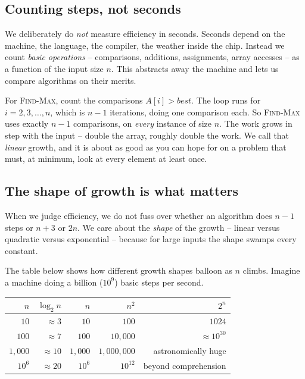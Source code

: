 \subsection{Counting steps, not seconds}

We deliberately do \emph{not} measure efficiency in seconds. Seconds depend on the
machine, the language, the compiler, the weather inside the chip. Instead we count
\emph{basic operations} -- comparisons, additions, assignments, array accesses --
as a function of the input size $n$. This abstracts away the machine and lets us
compare algorithms on their merits.

For \textsc{Find-Max}, count the comparisons $A[i] > best$. The loop runs for
$i = 2, 3, \dots, n$, which is $n - 1$ iterations, doing one comparison each. So
\textsc{Find-Max} uses exactly $n - 1$ comparisons, on \emph{every} instance of size
$n$. The work grows in step with the input -- double the array, roughly double the
work. We call that \emph{linear} growth, and it is about as good as you can hope for
on a problem that must, at minimum, look at every element at least once.

\subsection{The shape of growth is what matters}

When we judge efficiency, we do not fuss over whether an
algorithm does $n - 1$ steps or $n + 3$ or $2n$. We care about the \emph{shape} of
the growth -- linear versus quadratic versus exponential -- because for large
inputs the shape swamps every constant.

The table below shows how different growth shapes balloon as $n$ climbs. Imagine a
machine doing a billion ($10^9$) basic steps per second.

\begin{center}
\begin{tabular}{r r r r r}
\toprule
$n$ & $\log_2 n$ & $n$ & $n^2$ & $2^n$ \\
\midrule
$10$       & $\approx 3$  & $10$       & $100$              & $1024$ \\
$100$      & $\approx 7$  & $100$      & $10{,}000$         & $\approx 10^{30}$ \\
$1{,}000$  & $\approx 10$ & $1{,}000$  & $1{,}000{,}000$    & astronomically huge \\
$10^6$     & $\approx 20$ & $10^6$     & $10^{12}$          & beyond comprehension \\
\bottomrule
\end{tabular}
\end{center}


